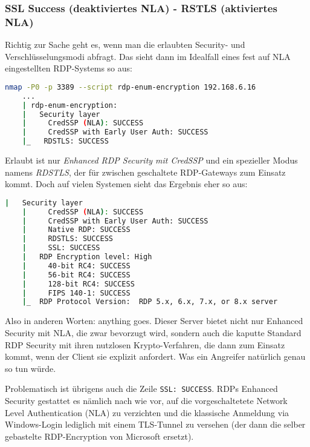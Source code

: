 \subsubsection{SSL Success (deaktiviertes NLA) - RSTLS (aktiviertes NLA)}

Richtig zur Sache geht es, wenn man die erlaubten Security- und Verschlüsselungsmodi abfragt. Das sieht dann im Idealfall eines fest auf NLA eingestellten RDP-Systems so aus:

\begin{lstlisting}[language=bash]
    nmap -P0 -p 3389 --script rdp-enum-encryption 192.168.6.16
    ...
    | rdp-enum-encryption:
    |   Security layer
    |     CredSSP (NLA): SUCCESS
    |     CredSSP with Early User Auth: SUCCESS
    |_   RDSTLS: SUCCESS
\end{lstlisting}

Erlaubt ist nur \textit{Enhanced RDP Security mit CredSSP} und ein spezieller Modus namens \textit{RDSTLS}, der für zwischen geschaltete RDP-Gateways zum Einsatz kommt. Doch auf vielen Systemen sieht das Ergebnis eher so aus:

\begin{lstlisting}[language=bash]
    |   Security layer
    |     CredSSP (NLA): SUCCESS
    |     CredSSP with Early User Auth: SUCCESS
    |     Native RDP: SUCCESS
    |     RDSTLS: SUCCESS
    |     SSL: SUCCESS
    |   RDP Encryption level: High
    |     40-bit RC4: SUCCESS
    |     56-bit RC4: SUCCESS
    |     128-bit RC4: SUCCESS
    |     FIPS 140-1: SUCCESS
    |_  RDP Protocol Version:  RDP 5.x, 6.x, 7.x, or 8.x server
\end{lstlisting}

Also in anderen Worten: \glqq anything goes\grqq. Dieser Server bietet nicht nur Enhanced Security mit NLA, die zwar bevorzugt wird, sondern auch die kaputte Standard RDP Security mit ihren nutzlosen Krypto-Verfahren, die dann zum Einsatz kommt, wenn der Client sie explizit anfordert. Was ein Angreifer natürlich genau so tun würde.

Problematisch ist übrigens auch die Zeile \lstinline|SSL: SUCCESS|. RDPs Enhanced Security gestattet es nämlich nach wie vor, auf die vorgeschaltetete Network Level Authentication (NLA) zu verzichten und die klassische Anmeldung via Windows-Login lediglich mit einem TLS-Tunnel zu versehen (der dann die selber gebastelte RDP-Encryption von Microsoft ersetzt).

